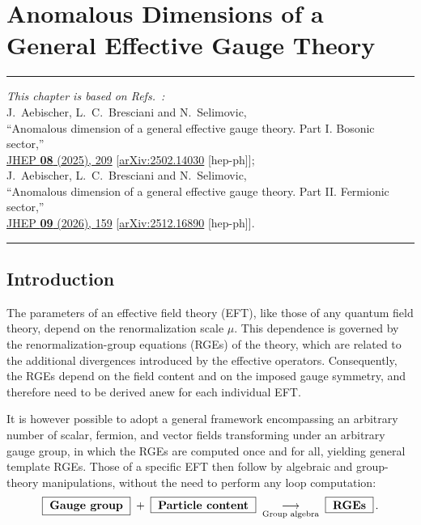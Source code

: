 \chapter{Anomalous Dimensions of a General Effective Gauge Theory\label{ch:generalEFT}}

\begin{flushright}
\small

{\color{chapterpaperrule}\rule{\textwidth}{0.5pt}}

\textit{This chapter is based on Refs.~\cite{Aebischer:2025zxg,Aebischer:2025ddl}:}\\[0.5em]
J.~Aebischer, L.~C.~Bresciani and N.~Selimovic,\\
``Anomalous dimension of a general effective gauge theory. Part I. Bosonic sector,''\\
\href{https://doi.org/10.1007/JHEP08(2025)209}{JHEP \textbf{08} (2025), 209}
[\href{https://doi.org/10.48550/arXiv.2502.14030}{arXiv:2502.14030} [hep-ph]];\\[0.5em]
J.~Aebischer, L.~C.~Bresciani and N.~Selimovic,\\
``Anomalous dimension of a general effective gauge theory. Part II. Fermionic sector,''\\
\href{https://doi.org/10.1007/JHEP09(2026)159}{JHEP \textbf{09} (2026), 159}
[\href{https://doi.org/10.48550/arXiv.2512.16890}{arXiv:2512.16890} [hep-ph]].

{\color{chapterpaperrule}\rule{\textwidth}{0.5pt}}
\end{flushright}

\section{Introduction}
The parameters of an effective field theory (EFT), like those of any quantum field theory, depend on the
renormalization scale $\mu$. This dependence is governed by the renormalization-group equations (RGEs) of the theory, which are related
to the additional divergences introduced by the effective operators. Consequently, the RGEs depend on
the field content and on the imposed gauge symmetry, and therefore need to be derived anew for each
individual EFT.

It is however possible to adopt a general framework encompassing an arbitrary number of scalar,
fermion, and vector fields transforming under an arbitrary gauge group, in which the RGEs are
computed once and for all, yielding general template RGEs. Those of a specific EFT then follow by
algebraic and group-theory manipulations, without the need to perform any loop computation:
\begin{equation*}
\boxed{\text{\textbf{\;Gauge group\;}}}\; +  \; \boxed{\text{\textbf{\;Particle content\;}}}\; \underset{\text{Group algebra}}{\longrightarrow}\;  \boxed{\text{\textbf{\;RGEs\;}}}\,.
\end{equation*}


